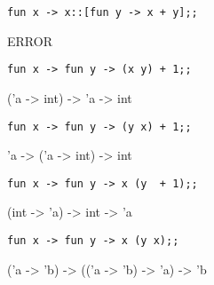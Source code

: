 \nextq
\verb!fun x -> x::[fun y -> x + y];;!
\\
\ANSWER
\begin{answerlong}
ERROR
\end{answerlong}

\nextq
\verb!fun x -> fun y -> (x y) + 1;;!
\\
\ANSWER
\begin{answerlong}
    ('a -> int) -> 'a -> int
\end{answerlong}

\nextq
\verb!fun x -> fun y -> (y x) + 1;;! 
\\
\ANSWER
\begin{answerlong}
    'a -> ('a -> int) -> int
\end{answerlong}

\nextq
\verb!fun x -> fun y -> x (y  + 1);;!
\\
\ANSWER
\begin{answerlong}
    (int -> 'a) -> int -> 'a
\end{answerlong}

\nextq
\verb!fun x -> fun y -> x (y x);;!
\\
\ANSWER
\begin{answerlong}
    ('a -> 'b) -> (('a -> 'b) -> 'a) -> 'b
\end{answerlong}

\newpage


